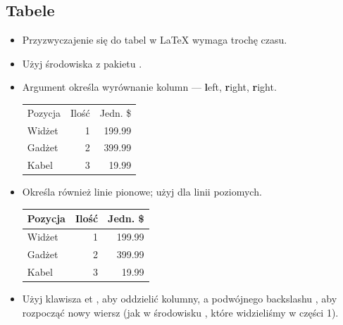 \documentclass{beamer}
\begin{document}
\subsection{Tabele}
\begin{frame}[fragile]{\insertsubsection}
\begin{itemize}
\item Przyzwyczajenie się do tabel w \LaTeX{} wymaga trochę czasu.
\item Użyj środowiska  z pakietu .
\item Argument określa wyrównanie kolumn --- \textbf{l}eft, \textbf{r}ight, \textbf{r}ight.
\begin{exampletwouptiny}
\begin{tabular}{lrr}
Pozycja   & Ilość & Jedn. \$ \\
Widżet & 1   & 199.99  \\
Gadżet & 2   & 399.99  \\
Kabel  & 3   & 19.99   \\
\end{tabular}
\end{exampletwouptiny}
\item Określa również linie pionowe; użyj  dla linii poziomych.
\begin{exampletwouptiny}
\begin{tabular}{|l|r|r|} \hline
Pozycja   & Ilość & Jedn. \$ \\\hline
Widżet & 1   & 199.99  \\
Gadżet & 2   & 399.99  \\
Kabel  & 3   & 19.99   \\\hline
\end{tabular}
\end{exampletwouptiny}
\item Użyj klawisza et \keystrokebftt{\&}, aby oddzielić kolumny, a podwójnego backslashu \keystrokebftt{\bs}\keystrokebftt{\bs}, aby rozpocząć nowy wiersz (jak w środowisku , które widzieliśmy w części 1).
\end{itemize}
\end{frame}

\end{document}
